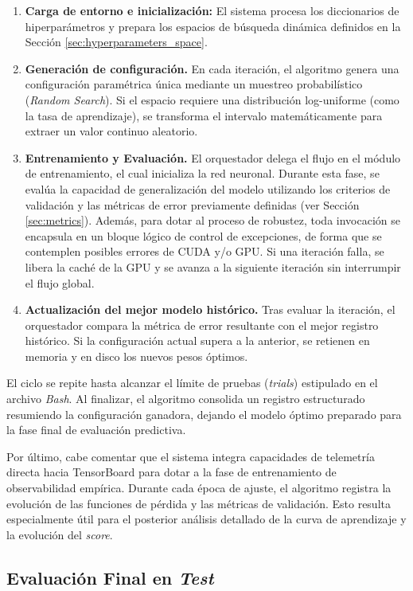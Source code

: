 \begin{enumerate}
	\item \textbf{Carga de entorno e inicialización:} El sistema procesa los diccionarios de hiperparámetros y prepara los espacios de búsqueda dinámica definidos en la Sección \ref{sec:hyperparameters_space}.
	\item \textbf{Generación de configuración.} En cada iteración, el algoritmo genera una configuración paramétrica única mediante un muestreo probabilístico (\textit{Random Search}). Si el espacio requiere una distribución log-uniforme (como la tasa de aprendizaje), se transforma el intervalo matemáticamente para extraer un valor continuo aleatorio.
	\item \textbf{Entrenamiento y Evaluación.} El orquestador delega el flujo en el módulo de entrenamiento, el cual inicializa la red neuronal. Durante esta fase, se evalúa la capacidad de generalización del modelo utilizando los criterios de validación y las métricas de error previamente definidas (ver Sección \ref{sec:metrics}). Además, para dotar al proceso de robustez, toda invocación se encapsula en un bloque lógico de control de excepciones, de forma que se contemplen posibles errores de CUDA y/o GPU. Si una iteración falla, se libera la caché de la GPU y se avanza a la siguiente iteración sin interrumpir el flujo global.
	\item \textbf{Actualización del mejor modelo histórico.} Tras evaluar la iteración, el orquestador compara la métrica de error resultante con el mejor registro histórico. Si la configuración actual supera a la anterior, se retienen en memoria y en disco los nuevos pesos óptimos.
\end{enumerate}

El ciclo se repite hasta alcanzar el límite de pruebas (\textit{trials}) estipulado en el archivo \textit{Bash}. Al finalizar, el algoritmo consolida un registro estructurado resumiendo la configuración ganadora, dejando el modelo óptimo preparado para la fase final de evaluación predictiva.

Por último, cabe comentar que el sistema integra capacidades de telemetría directa hacia TensorBoard para dotar a la fase de entrenamiento de observabilidad empírica. Durante cada época de ajuste, el algoritmo registra la evolución de las funciones de pérdida y las métricas de validación. Esto resulta especialmente útil para el posterior análisis detallado de la curva de aprendizaje y la evolución del \textit{score}. 


\subsection{Evaluación Final en \textit{Test}}
\label{sec:final_evaluation}

